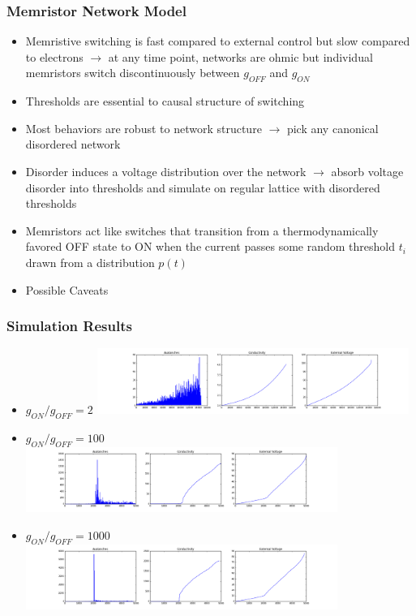 \documentclass[mathserif]{beamer}
\begin{document}
\begin{frame}
\frametitle{Memristor Network Model}
\begin{itemize}
\item Memristive switching is fast compared to external control
but slow compared to electrons $\to$ at any time point, networks are
ohmic but individual memristors switch discontinuously between
$g_{OFF}$ and $g_{ON}$
\item Thresholds are essential to causal structure of switching
\item Most behaviors are robust to network structure $\to$ pick any canonical disordered network
\item Disorder induces a voltage distribution over the network $\to$ absorb voltage disorder into
thresholds and simulate on regular lattice with disordered thresholds
\item Memristors act like switches that transition from a thermodynamically favored OFF state
to ON when the current passes some random threshold $t_i$ drawn from a distribution $p(t)$
\item Possible Caveats
\end{itemize}

\end{frame}

\begin{frame}
\frametitle{Simulation Results}
\begin{itemize}
\item $g_{ON} / g_{OFF} = 2$
\includegraphics[width=0.8\textwidth]{ON2_run.png}
\item $g_{ON} / g_{OFF} = 100$
\includegraphics[width=0.8\textwidth]{ON100_run.png}
\item $g_{ON} / g_{OFF} = 1000$
\includegraphics[width=0.8\textwidth]{ON1000_run.png}
\end{itemize}
\end{frame}
\end{document}
